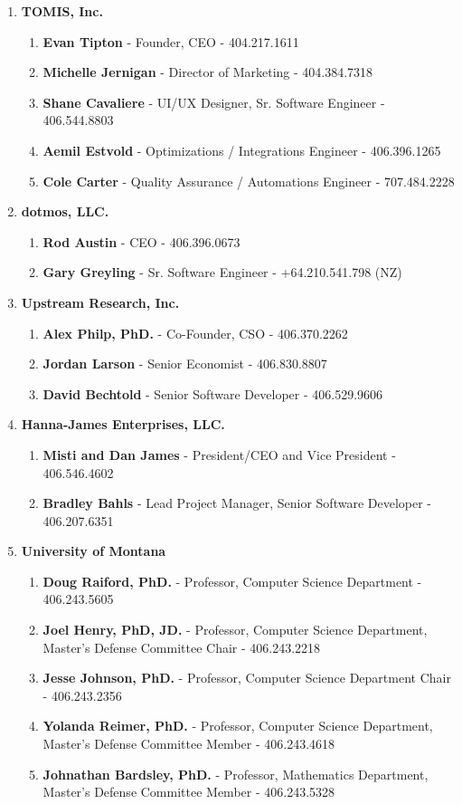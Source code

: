 \documentclass[oneside]{article}%
\begin{document}
\begin{enumerate}[]
	\item \large \textbf{TOMIS, Inc.} \small
		\begin{enumerate}[]
			\item \textbf{Evan Tipton} - Founder, CEO - 404.217.1611
			\item \textbf{Michelle Jernigan} - Director of Marketing - 404.384.7318
			\item \textbf{Shane Cavaliere} - UI/UX Designer, Sr. Software Engineer - 406.544.8803
			\item \textbf{Aemil Estvold} - Optimizations / Integrations Engineer - 406.396.1265
			\item \textbf{Cole Carter} - Quality Assurance / Automations Engineer - 707.484.2228
		\end{enumerate}
	\item \large \textbf{dotmos, LLC.} \small
		\begin{enumerate}[]
			\item \textbf{Rod Austin} - CEO - 406.396.0673
			\item \textbf{Gary Greyling} - Sr. Software Engineer - +64.210.541.798 (NZ)
		\end{enumerate}
	\item \large \textbf{Upstream Research, Inc.} \small
		\begin{enumerate}[]
			\item \textbf{Alex Philp, PhD.} - Co-Founder, CSO - 406.370.2262
			\item \textbf{Jordan Larson} - Senior Economist - 406.830.8807
			\item \textbf{David Bechtold} - Senior Software Developer - 406.529.9606
		\end{enumerate}
	\item \large \textbf{Hanna-James Enterprises, LLC.} \small
		\begin{enumerate}[]
			\item \textbf{Misti and Dan James} - President/CEO and Vice President - 406.546.4602
			\item \textbf{Bradley Bahls} - Lead Project Manager, Senior Software Developer - 406.207.6351
		\end{enumerate}
	\item \large \textbf{University of Montana} \small
		\begin{enumerate}[]
			\item \textbf{Doug Raiford, PhD.} - Professor, Computer Science Department - 406.243.5605
			\item \textbf{Joel Henry, PhD, JD.} - Professor, Computer Science Department, Master's Defense Committee Chair - 406.243.2218
			\item \textbf{Jesse Johnson, PhD.} - Professor, Computer Science Department Chair - 406.243.2356
			\item \textbf{Yolanda Reimer, PhD.} - Professor, Computer Science Department, Master's Defense Committee Member - 406.243.4618
			\item \textbf{Johnathan Bardsley, PhD.} - Professor, Mathematics Department, Master's Defense Committee Member - 406.243.5328
		\end{enumerate}
\end{enumerate}
\end{document}

